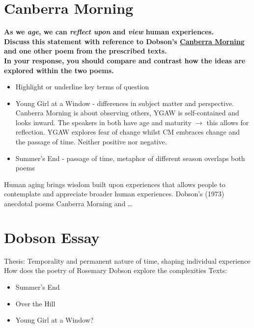 \section{Canberra Morning} \label{28/11/2024}
	\textbf{As we \textit{age}, we can \textit{reflect upon} and \textit{view} human experiences. \\
	Discuss this statement with reference to Dobson's \underline{Canberra Morning} and one other poem from the prescribed texts. \\
	In your response, you should compare and contrast how the ideas are explored within the two poems.}

	\begin{itemize}
		\item Highlight or underline key terms of question
		\item Young Girl at a Window - differences in subject matter and perspective. Canberra Morning is about observing others, YGAW is self-contained and looks inward. The speakers in both have age and maturity $\rightarrow$ this allows for reflection. YGAW explores fear of change whilst CM embraces change and the passage of time. Neither positive nor negative.
	\item Summer's End - passage of time, metaphor of different season overlaps both poems
	\end{itemize}

	Human aging brings wisdom built upon experiences that allows people to contemplate and appreciate broader human experiences. Dobson's (1973) anecdotal poems Canberra Morning and \dots

\section{Dobson Essay} \label{13/12/2024}
	Thesis: Temporality and permanent nature of time, shaping individual experience
	How does the poetry of Rosemary Dobson explore the complexities
	Texts:
	\begin{itemize}
		\item Summer's End
		\item Over the Hill
		\item Young Girl at a Window?
	\end{itemize}
	